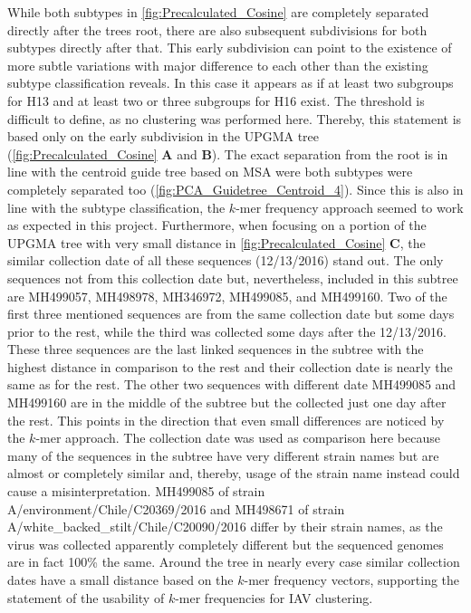 While both subtypes in \autoref{fig:Precalculated_Cosine} are completely separated directly after the trees root, there are also subsequent subdivisions for both subtypes directly after that. This early subdivision can point to the existence of more subtle variations with major difference to each other than the existing subtype classification reveals. In this case it appears as if at least two subgroups for H13 and at least two or three subgroups for H16 exist. The threshold is difficult to define, as no clustering was performed here. Thereby, this statement is based only on the early subdivision in the \gls{UPGMA} tree (\autoref{fig:Precalculated_Cosine} \textbf{\textsf{A}} and \textbf{\textsf{B}}). The exact separation from the root is in line with the centroid guide tree based on \gls{MSA} were both subtypes were completely separated too (\autoref{fig:PCA_Guidetree_Centroid_4}). Since this is also in line with the subtype classification, the $k$-mer frequency approach seemed to work as expected in this project. Furthermore, when focusing on a portion of the \gls{UPGMA} tree with very small distance in \autoref{fig:Precalculated_Cosine} \textbf{\textsf{C}}, the similar collection date of all these sequences (12/13/2016) stand out. The only sequences not from this collection date but, nevertheless, included in this subtree are MH499057, MH498978, MH346972, MH499085, and MH499160. Two of the first three mentioned sequences are from the same collection date but some days prior to the rest, while the third was collected some days after the 12/13/2016. These three sequences are the last linked sequences in the subtree with the highest distance in comparison to the rest and their collection date is nearly the same as for the rest. The other two sequences with different date MH499085 and MH499160 are in the middle of the subtree but the collected just one day after the rest. This points in the direction that even small differences are noticed by the $k$-mer approach. The collection date was used as comparison here because many of the sequences in the subtree have very different strain names but are almost or completely similar and, thereby, usage of the strain name instead could cause a misinterpretation. MH499085 of strain A/environment/Chile/C20369/2016 and MH498671 of strain A/white\_backed\_stilt/Chile/C20090/2016 differ by their strain names, as the virus was collected apparently completely different but the sequenced genomes are in fact 100\% the same. Around the tree in nearly every case similar collection dates have a small distance based on the $k$-mer frequency vectors, supporting the statement of the usability of $k$-mer frequencies for \gls{IAV} clustering. %

